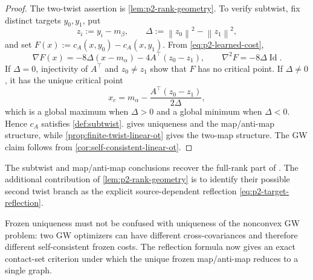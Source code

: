 \documentclass[11pt,a4paper]{article}
\theoremstyle{definition}
\theoremstyle{remark}
\newcommand{\Id}{\operatorname{Id}}
\newcommand{\norm}[1]{\left\lVert #1\right\rVert}
\begin{document}
\begin{proof}
The two-twist assertion is \cref{lem:p2-rank-geometry}.  To verify subtwist,
fix distinct targets \(y_0,y_1\), put
\begin{equation*}
  z_i:=y_i-m_\beta,
  \qquad
  \Delta:=\norm{z_0}^2-\norm{z_1}^2,
\end{equation*}
and set \(F(x):=c_A(x,y_0)-c_A(x,y_1)\).  From
\eqref{eq:p2-learned-cost},
\begin{equation}
  \nabla F(x)=-8\Delta(x-m_\alpha)-4A^\top(z_0-z_1),
  \qquad
  \nabla^2F=-8\Delta\Id.
  \label{eq:p2-subtwist-difference}
\end{equation}
If \(\Delta=0\), injectivity of \(A^\top\) and \(z_0\ne z_1\) show that
\(F\) has no critical point.  If \(\Delta\ne0\), it has the unique critical
point
\begin{equation*}
  x_c=m_\alpha-\frac{A^\top(z_0-z_1)}{2\Delta},
\end{equation*}
which is a global maximum when \(\Delta>0\) and a global minimum when
\(\Delta<0\).  Hence \(c_A\) satisfies \cref{def:subtwist}.
 gives uniqueness and the map/anti-map structure,
while \cref{prop:finite-twist-linear-ot} gives the two-map structure.  The GW
claim follows from \cref{cor:self-consistent-linear-ot}.
\end{proof}

The subtwist and map/anti-map conclusions recover the full-rank part of
\citet[Theorem~3.6]{DumontLacombeVialard2025}.  The additional contribution of
\cref{lem:p2-rank-geometry} is to identify their possible second twist branch
as the explicit source-dependent reflection \eqref{eq:p2-target-reflection}.

Frozen uniqueness must not be confused with uniqueness of the nonconvex GW
problem: two GW optimizers can have different cross-covariances and therefore
different self-consistent frozen costs.  The reflection formula now gives an
exact contact-set criterion under which the unique frozen map/anti-map reduces
to a single graph.
\end{document}
